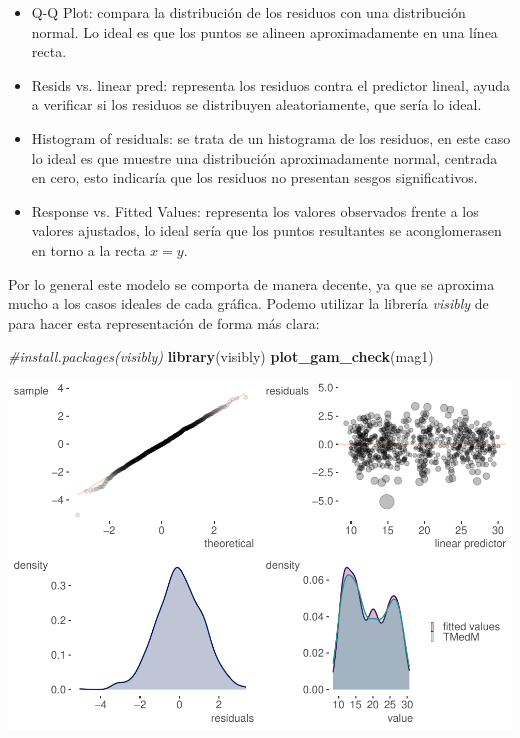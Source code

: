 \documentclass[12pt,a4paper,]{book}
\newenvironment{Shaded}{\begin{snugshade}}{\end{snugshade}}
\newcommand{\CommentTok}[1]{\textcolor[rgb]{0.56,0.35,0.01}{\textit{#1}}}
\newcommand{\FunctionTok}[1]{\textcolor[rgb]{0.13,0.29,0.53}{\textbf{#1}}}
\newcommand{\NormalTok}[1]{#1}
\numberwithin{dummy}{section}
\theoremstyle{ocrenumbox}
\theoremstyle{blacknumex}
\theoremstyle{blacknumbox}
\theoremstyle{ocrenum}
\theoremstyle{ocrenum}
\begin{document}
\begin{itemize}
  \item Q-Q Plot: compara la distribución de los residuos con una distribución normal. Lo ideal es que los puntos se alineen aproximadamente en una línea recta.
  \item Resids vs. linear pred: representa los residuos contra el predictor lineal, ayuda a verificar si los residuos se distribuyen aleatoriamente, que sería lo ideal.
  \item Histogram of residuals: se trata de un histograma de los residuos, en este caso lo ideal es que muestre una distribución aproximadamente normal, centrada en cero, esto indicaría que los residuos no presentan sesgos significativos.
  \item Response vs. Fitted Values: representa los valores observados frente a los valores ajustados, lo ideal sería que los puntos resultantes se aconglomerasen en torno a la recta $x=y$.
\end{itemize}

Por lo general este modelo se comporta de manera decente, ya que se
aproxima mucho a los casos ideales de cada gráfica. Podemo utilizar la
librería \emph{visibly} de \citet{M-Clark} para hacer esta
representación de forma más clara:

\begin{Shaded}
\begin{Highlighting}[]
\CommentTok{\#install.packages(\textquotesingle{}visibly\textquotesingle{})}
\FunctionTok{library}\NormalTok{(visibly)}
\FunctionTok{plot\_gam\_check}\NormalTok{(mag1)}
\end{Highlighting}
\end{Shaded}

\begin{center}\includegraphics[width=0.95\linewidth]{figurasR/unnamed-chunk-13-1} \end{center}
\end{document}
